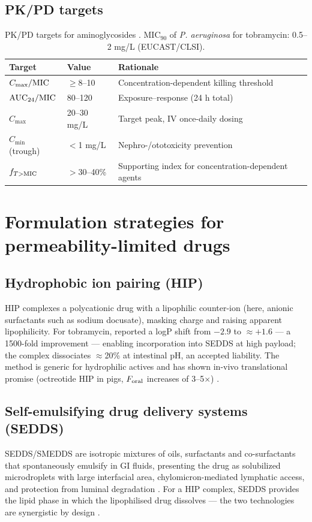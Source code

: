 \subsection{PK/PD targets}
\begin{table}[htbp]
\centering
\caption{PK/PD targets for aminoglycosides \citep{Craig1998, Li2021, Bauer2008}. MIC$_{90}$ of \textit{P. aeruginosa} for tobramycin: 0.5--2 mg/L (EUCAST/CLSI).}
\label{tab:pd-targets}
\begin{tabular}{p{3.4cm}p{3.2cm}p{6.4cm}}
\toprule
Target & Value & Rationale\\
\midrule
$C_{\max}/\mathrm{MIC}$ & $\geq$8--10 & Concentration-dependent killing threshold \citep{Craig1998}\\
$\mathrm{AUC}_{24}/\mathrm{MIC}$ & 80--120 & Exposure--response (24 h total) \citep{Li2021}\\
$C_{\max}$ & 20--30 mg/L & Target peak, IV once-daily dosing \citep{Bauer2008}\\
$C_{\min}$ (trough) & $<$1 mg/L & Nephro-/ototoxicity prevention\\
$f_{T>\mathrm{MIC}}$ & $>$30--40\% & Supporting index for concentration-dependent agents\\
\bottomrule
\end{tabular}
\end{table}

\section{Formulation strategies for permeability-limited drugs}
\label{sec:lit-formulations}

\subsection{Hydrophobic ion pairing (HIP)}
HIP complexes a polycationic drug with a lipophilic counter-ion (here, anionic surfactants such as sodium docusate), masking charge and raising apparent lipophilicity. For tobramycin, \citet{Asad2023} reported a logP shift from $-2.9$ to $\approx+1.6$ --- a 1500-fold improvement --- enabling incorporation into SEDDS at high payload; the complex dissociates $\approx$20\% at intestinal pH, an accepted liability. The method is generic for hydrophilic actives \citep{Griesser2017} and has shown in-vivo translational promise (octreotide HIP in pigs, $F_{\mathrm{oral}}$ increases of 3--5$\times$) \citep{Bonengel2018}.

\subsection{Self-emulsifying drug delivery systems (SEDDS)}
SEDDS/SMEDDS are isotropic mixtures of oils, surfactants and co-surfactants that spontaneously emulsify in GI fluids, presenting the drug as solubilized microdroplets with large interfacial area, chylomicron-mediated lymphatic access, and protection from luminal degradation \citep{Muhammad2022}. For a HIP complex, SEDDS provides the lipid phase in which the lipophilised drug dissolves --- the two technologies are synergistic by design \citep{Asad2023, Griesser2017}.

